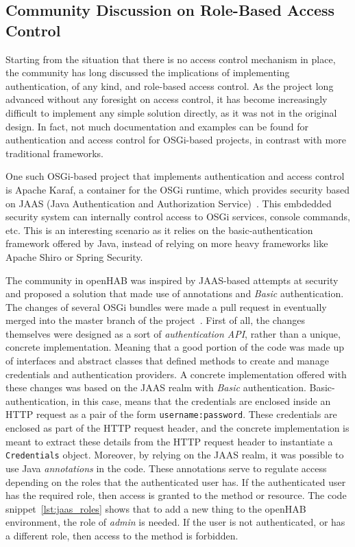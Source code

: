 \documentclass[12pt]{article}
\begin{document}
\subsection{Community Discussion on Role-Based Access Control}
\label{ssec:discussion}

Starting from the situation that there is no access control mechanism in place, the community has long discussed the implications of implementing authentication, of any kind, and role-based access control. As the project long advanced without any foresight on access control, it has become increasingly difficult to implement any simple solution directly, as it was not in the original design. In fact, not much documentation and examples can be found for authentication and access control for OSGi-based projects, in contrast with more traditional frameworks.

One such OSGi-based project that implements authentication and access control is Apache Karaf, a container for the OSGi runtime, which provides security based on JAAS (Java Authentication and Authorization Service)~\cite{karaf}. This embdedded security system can internally control access to OSGi services, console commands, etc. This is an interesting scenario as it relies on the basic-authentication framework offered by Java, instead of relying on more heavy frameworks like Apache Shiro or Spring Security.

The community in openHAB was inspired by JAAS-based attempts at security and proposed a solution that made use of annotations and \emph{Basic} authentication. The changes of several OSGi bundles were made a pull request in eventually merged into the master branch of the project~\cite{esh_04}. First of all, the changes themselves were designed as a sort of \emph{authentication API}, rather than a unique, concrete implementation. Meaning that a good portion of the code was made up of interfaces and abstract classes that defined methods to create and manage credentials and authentication providers. A concrete implementation offered with these changes was based on the JAAS realm with \emph{Basic} authentication. Basic-authentication, in this case, means that the credentials are enclosed inside an HTTP request as a pair of the form \texttt{username:password}. These credentials are enclosed as part of the HTTP request header, and the concrete implementation is meant to extract these details from the HTTP request header to instantiate a \texttt{Credentials} object. Moreover, by relying on the JAAS realm, it was possible to use Java \emph{annotations} in the code. These annotations serve to regulate access depending on the roles that the authenticated user has. If the authenticated user has the required role, then access is granted to the method or resource. The code snippet~\ref{lst:jaas_roles} shows that to add a new thing to the openHAB environment, the role of \emph{admin} is needed. If the user is not authenticated, or has a different role, then access to the method is forbidden. 
\end{document}

